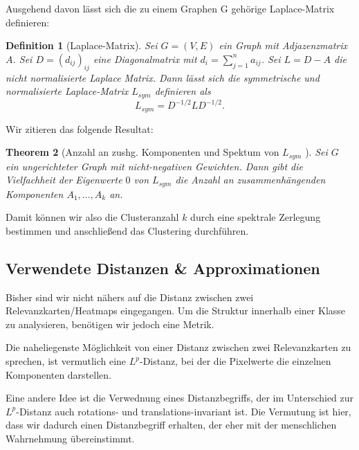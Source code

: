 \documentclass[11pt,a4paper]{article}
\def\emph#1{\textit{#1}}
\newtheorem{theorem}{Theorem}[subsection]
\newtheorem{definition}[theorem]{Definition}
\numberwithin{equation}{section}
\begin{document}
	
	
	Ausgehend davon lässt sich die zu einem Graphen G gehörige Laplace-Matrix definieren:
	
	\begin{definition}[Laplace-Matrix]
		Sei $G=(V,E)$ ein Graph mit Adjazenzmatrix $A$. Sei $D = (d_{ij})_{ij}$ eine Diagonalmatrix mit $d_{i} = \sum_{j=1}^n{a_{ij}}$. Sei $L=D-A$ die \emph{nicht normalisierte Laplace Matrix}. Dann lässt sich die symmetrische und normalisierte Laplace-Matrix $L_{sym}$ definieren als
		\begin{equation}
		L_{sym} = D^{-1/2}LD^{-1/2}.
		\end{equation}
	\end{definition}
	
	
	Wir zitieren das folgende Resultat:
	
	\begin{theorem}[Anzahl an zushg. Komponenten und Spektum von $L_{sym}$ \cite{spectralClustering_tut}]
		Sei $G$ ein ungerichteter Graph mit nicht-negativen Gewichten. Dann gibt die Vielfachheit der Eigenwerte $0$ von $L_{sym}$ die Anzahl an zusammenhängenden Komponenten $A_1,..., A_k$ an.
	\end{theorem}
	
	Damit können wir also die Clusteranzahl $k$ durch eine spektrale Zerlegung bestimmen und anschließend das Clustering durchführen.
	
	
	
	
	
	
	
	
	
	
	
	\subsection{Verwendete Distanzen \& Approximationen}
	Bisher sind wir nicht nähers auf die Distanz zwischen zwei Relevanzkarten/Heatmaps eingegangen. Um die Struktur innerhalb einer Klasse zu analysieren, benötigen wir jedoch eine Metrik.
	
	Die naheliegenste Möglichkeit von einer Distanz zwischen zwei Relevanzkarten zu sprechen, ist vermutlich eine $L^p$-Distanz, bei der die Pixelwerte die einzelnen Komponenten darstellen. 
	
	Eine andere Idee ist die Verwednung eines Distanzbegriffs, der im Unterschied zur $L^p$-Distanz auch rotations- und translations-invariant ist. Die Vermutung ist hier, dass wir dadurch einen Distanzbegriff erhalten, der eher mit der menschlichen Wahrnehmung übereinstimmt.
	
\end{document}
